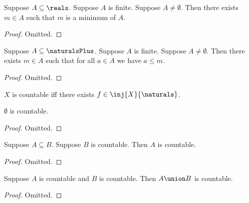 \begin{lemma}\label{finite_real_minimum}
    Suppose $A\subseteq\reals$.
    Suppose $A$ is finite.
    Suppose $A\neq \emptyset$.
    Then there exists $m\in A$ such that $m$ is a minimum of $A$.
\end{lemma}
\begin{proof}
    Omitted.
\end{proof}

\begin{lemma}\label{finite_naturals_maximum}
    Suppose $A\subseteq\naturalsPlus$.
    Suppose $A$ is finite.
    Suppose $A\neq \emptyset$.
    Then there exists $m\in A$ such that for all $a\in A$ we have $a \leq m$.
\end{lemma}
\begin{proof}
    Omitted.
\end{proof}

\begin{definition}\label{countable}
    $X$ is countable iff there exists $f\in\inj{X}{\naturals}$.
\end{definition}

\begin{lemma}\label{emptyset_is_countable}
    $\emptyset$ is countable.
\end{lemma}
\begin{proof}
   Omitted.
\end{proof}

\begin{lemma}\label{subseteq_countable_is_countable}
    Suppose $A\subseteq B$.
    Suppose $B$ is countable.
    Then $A$ is countable.
\end{lemma}
\begin{proof}
    Omitted.
\end{proof}

\begin{lemma}\label{union_of_countable_is_countable}
    Suppose $A$ is countable and $B$ is countable.
    Then $A\union B$ is countable.
\end{lemma}
\begin{proof}
    Omitted.
\end{proof}


